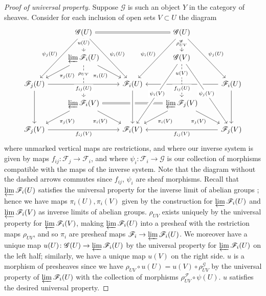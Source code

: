 \documentclass[12pt,letterpaper]{article}
\theoremstyle{definition}
\theoremstyle{remark}
\numberwithin{equation}{section}
\numberwithin{figure}{problem}
\begin{document}
\begin{proof}[Proof of universal property]
  Suppose $\mathscr{G}$ is such an object $Y$ in the category of sheaves. Consider for each inclusion of open sets $V \subset U$ the diagram
  \begin{equation*}
    \begin{tikzcd}[row sep=small]
      {}& \mathscr{G}(U) \arrow[equal]{rr}\arrow[dashed]{dd}[description,yshift=3pt]{u(U)}\arrow{ddddl}[swap]{\psi_j(U)}\arrow{ddddr}{\psi_i(U)} & & \mathscr{G}(U)\arrow{dd}[description,yshift=3pt]{\rho_{UV}^\mathscr{G}}\arrow{ddddl}[swap]{\psi_i(U)}\arrow{ddddr}{\psi_j(U)}\\
      \\
      & \varprojlim \mathscr{F}_i(U)\arrow{ddl}{\pi_j(U)}\arrow{ddr}[swap]{\pi_i(U)}\arrow[dashed]{ddd}[description,yshift=10pt]{\rho_{UV}} & & \mathscr{G}(V)\arrow[dashed]{ddd}[description,yshift=10pt]{u(V)}\\
      \\
      \mathscr{F}_j(U) \arrow{rr}[swap,fill=white]{f_{ij}(U)}\arrow{ddd} & & \mathscr{F}_i(U) & & \mathscr{F}_i(U)\arrow{ll}[fill=white]{f_{ij}(U)}\arrow{ddd}\\
      & \varprojlim \mathscr{F}_i(V) \arrow[equal]{rr}\arrow{ddl}{\pi_j(V)}\arrow{ddr}[swap]{\pi_i(V)} & & \varprojlim \mathscr{F}_j(V)\arrow{ddl}{\pi_i(V)}\arrow{ddr}[swap]{\pi_j(V)}\\
      \\
      \mathscr{F}_j(V) \arrow{rr}[swap]{f_{ij}(V)} & & \mathscr{F}_i(V)\arrow[leftarrow,crossing over]{uuu}\arrow[leftarrow,crossing over]{uuuuur}[description]{\psi_i(V)} & & \mathscr{F}_j(V)\arrow{ll}{f_{ij}(V)}\arrow[leftarrow,crossing over]{uuuuul}[description]{\psi_j(V)}
    \end{tikzcd}
  \end{equation*}
  where unmarked vertical maps are restrictions, and where our inverse system is given by maps $f_{ij}\colon \mathscr{F}_j \to \mathscr{F}_i$, and where $\psi_i\colon \mathscr{F}_i \to \mathscr{G}$ is our collection of morphisms compatible with the maps of the inverse system. Note that the diagram without the dashed arrows commutes since $f_{ij}$, $\psi_i$ are sheaf morphisms. Recall that $\varprojlim\mathscr{F}_i(U)$ satisfies the universal property for the inverse limit of abelian groups \cite[III, Thm.~10.2]{Lan02}; hence we have maps $\pi_i(U),\pi_i(V)$ given by the construction for $\varprojlim\mathscr{F}_i(U)$ and $\varprojlim\mathscr{F}_i(V)$ as inverse limits of abelian groups. $\rho_{UV}$ exists uniquely by the universal property for $\varprojlim\mathscr{F}_i(V)$, making $\varprojlim \mathscr{F}_i(U)$ into a presheaf with the restriction maps $\rho_{UV}$, and so $\pi_i$ are presheaf maps $\mathscr{F}_i \to \varprojlim \mathscr{F}_i(U)$. We moreover have a unique map $u(U)\colon \mathscr{G}(U) \to \varprojlim \mathscr{F}_i(U)$ by the universal property for $\varprojlim\mathscr{F}_i(U)$ on the left half; similarly, we have a unique map $u(V)$ on the right side. $u$ is a morphism of presheaves since we have $\rho_{UV} \circ u(U) = u(V) \circ \rho_{UV}^\mathscr{G}$ by the universal property of $\varprojlim\mathscr{F}_i(U)$ with the collection of morphisms $\rho_{UV}^\mathscr{F} \circ \psi(U)$. $u$ satisfies the desired universal property.

\end{proof}
\end{document}
